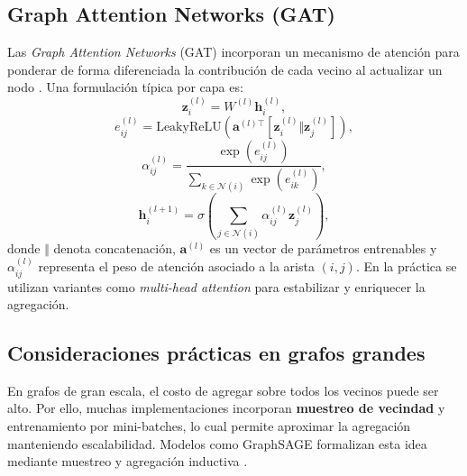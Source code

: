 \subsection{Graph Attention Networks (GAT)}

Las \textit{Graph Attention Networks} (GAT) incorporan un mecanismo de atención para ponderar de forma diferenciada la contribución de cada vecino al actualizar un nodo \cite{GAT}. Una formulación típica por capa es:
\[
\mathbf{z}_i^{(l)}=W^{(l)}\mathbf{h}_i^{(l)},
\]
\[
e_{ij}^{(l)}=\mathrm{LeakyReLU}\left(\mathbf{a}^{(l)\top}[\mathbf{z}_i^{(l)} \Vert \mathbf{z}_j^{(l)}]\right),
\]
\[
\alpha_{ij}^{(l)}=\frac{\exp(e_{ij}^{(l)})}{\sum_{k\in\mathcal{N}(i)}\exp(e_{ik}^{(l)})},
\]
\[
\mathbf{h}_i^{(l+1)}=\sigma\left(\sum_{j\in\mathcal{N}(i)}\alpha_{ij}^{(l)}\mathbf{z}_j^{(l)}\right),
\]
donde $\Vert$ denota concatenación, $\mathbf{a}^{(l)}$ es un vector de parámetros entrenables y $\alpha_{ij}^{(l)}$ representa el peso de atención asociado a la arista $(i,j)$. En la práctica se utilizan variantes como \textit{multi-head attention} para estabilizar y enriquecer la agregación.

\subsection{Consideraciones prácticas en grafos grandes}

En grafos de gran escala, el costo de agregar sobre todos los vecinos puede ser alto. Por ello, muchas implementaciones incorporan \textbf{muestreo de vecindad} y entrenamiento por mini-batches, lo cual permite aproximar la agregación manteniendo escalabilidad. Modelos como GraphSAGE formalizan esta idea mediante muestreo y agregación inductiva \cite{GraphSAGE}.

